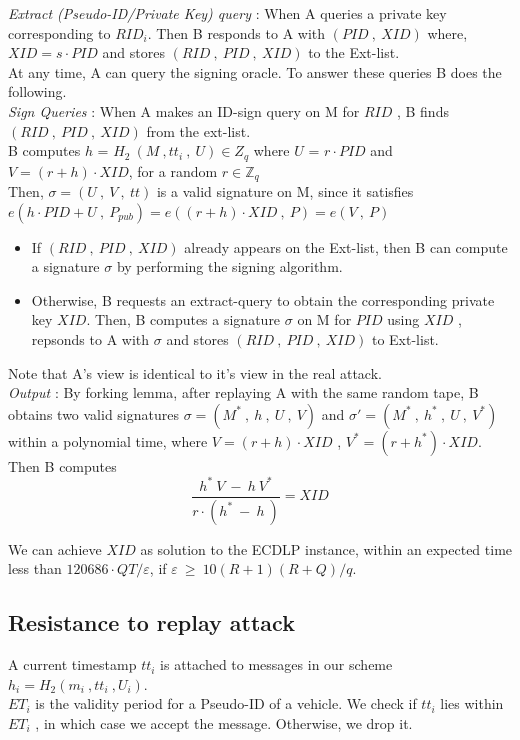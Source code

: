\documentclass[10pt,journal,letterpaper]{IEEEtran}
\begin{document}
\noindent\emph{Extract (Pseudo-ID/Private Key) query} : When A queries a private key corresponding to $RID_i$. Then B responds to A with $(PID\:,\:XID)$ where, $XID = s \cdot PID$ and stores $(RID\:,\:PID\:,\:XID)$ to the Ext-list.\\
At any time, A can query the signing oracle. To answer these queries B does the following.\\

\noindent\emph{Sign Queries} :  When A makes an ID-sign query on M for $RID$ , B finds $(RID\:,\:PID\:,\:XID)$ from the ext-list.\\
B computes $h$ = $H_2\:(M\:,tt_i\:,\:U) \in Z_q$ where $U$ = $r\cdot PID$ and $V = (r+h)\cdot XID$, for a random $r \in \mathbb{Z}_q$\\

Then, $\sigma = (U\:,\:V\:,\:tt)$ is a valid signature on M, since
it satisfies $e(h\cdot PID + U\:,\: P_{pub})  = e((r+h)\cdot XID
\:,\:P) = e(V\:,\:P)$
\begin{itemize}
    \item If $(RID\: , \:PID\: , \:XID)$ already appears on the Ext-list, then B can compute a signature $\sigma$ by performing the signing algorithm.
    \item Otherwise, B requests an extract-query to obtain the corresponding private key $XID$. Then, B computes a signature $\sigma$ on M for $PID$ using $XID$ , repsonds to A with $\sigma$ and stores $(RID\:,\:PID\:,\:XID)$ to Ext-list.
\end{itemize}
Note that A's view is identical to it's view in the real attack.\\

\emph{Output} : By forking lemma, after replaying A with the same
random tape, B obtains two valid signatures $\sigma = (M^*\:,\:
h\:,\:  U \:,\:  V)$ and $\sigma' = (M^* \:,\: h^* \:,\: U \:,\:
V^*)$ within a polynomial time, where $V = (r+h)\cdot XID$ , $V^* =
(r+h^*)\cdot XID$. Then B computes
\begin{equation}
    \displaystyle \frac{h^* \: V \:-\: h \: V^*}{r\cdot(h^*\: -\: h\:)} = XID
\end{equation}

We can achieve $XID$ as solution to the ECDLP instance, within an
expected time less than $120686\cdot QT/\varepsilon$, if
$\varepsilon\: \geq\: 10(R+1)(R+Q)/q$.


\subsection{Resistance to replay attack}
A current timestamp $tt_i$ is attached to messages in our scheme
$h_i = H_2(m_i\:,tt_i \: , U_i)$. \\
$ET_i$ is the validity period for a Pseudo-ID of a vehicle. We check
if $tt_i$ lies within $ET_i$ , in which case we accept the message.
Otherwise, we drop it.
\end{document}
